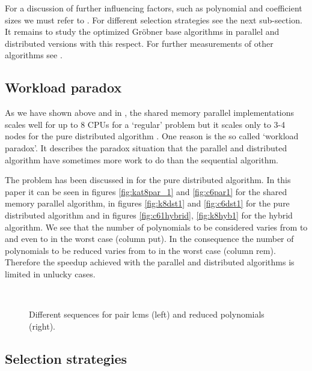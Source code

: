 \documentclass[10pt,twocolumn,a4paper]{article}
\begin{document}
For a discussion of further influencing factors, such as polynomial
and coefficient sizes we must refer to \cite{Kredel:2009}.  For
different selection strategies see the next sub-section.  It remains
to study the optimized Gr\"obner base algorithms
\cite{GebauerMoeller:1988,GioviniMora:1991,Faugere:1999,Faugere:2002} in parallel and
distributed versions with this respect.  
 For further measurements of other algorithms see
 \cite{Kredel:2008a,Kredel:2009,Kredel:2010a}.


\subsection{Workload paradox} \label{sec:workpara}

As we have shown above and in \cite{Kredel:2006}, the shared memory
parallel implementations scales well for up to 8 CPUs for a `regular'
problem but it scales only to 3-4 nodes for the pure distributed
algorithm \cite{Kredel:2009}.  One reason is the so called `workload
paradox'. It describes the paradox situation that the parallel and
distributed algorithm have sometimes more work to do than the
sequential algorithm.

The problem has been discussed in \cite{Kredel:2009} for the pure
distributed algorithm.  In this paper it can be seen in figures
\ref{fig:kat8par_1} and \ref{fig:c6par1} for the shared memory parallel
algorithm, in figures \ref{fig:k8dst1} and \ref{fig:c6dst1} for the
pure distributed algorithm and in figures \ref{fig:c61hybrid},
\ref{fig:k8hyb1} for the hybrid algorithm.  We see that the number of
polynomials to be considered varies from  to  and even to
 in the worst case (column put). In the consequence the number of
polynomials to be reduced varies from  to  in the worst
case (column rem). Therefore the speedup achieved with the parallel
and distributed algorithms is limited in unlucky cases.

\begin{figure}[thb]
\centering
{}
\mbox{\  }
\caption{Different sequences for pair lcms (left) and reduced polynomials (right).}
\label{fig:lcmpairsdiff}
\label{fig:hpolpairsdiff}
\end{figure}


\subsection{Selection strategies} \label{sec:select}
\end{document}
